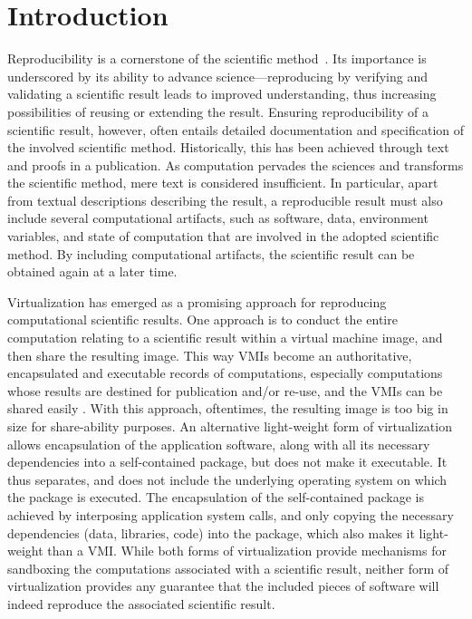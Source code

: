 \section{Introduction}

Reproducibility is a cornerstone of the scientific method~\cite{borgman2012data}. 
Its importance is underscored by its ability to advance science---reproducing by verifying and validating a scientific result leads to improved understanding, thus increasing possibilities of reusing or extending the result. 
Ensuring reproducibility of a scientific result, however, often entails detailed documentation and specification of the involved scientific method. Historically, this has been achieved through text and proofs in a publication. 
As computation pervades the sciences and transforms the scientific method, mere text is considered insufficient. 
In particular, apart from textual descriptions describing the result, a reproducible result must also include several computational artifacts, such as software, data,  environment variables, and state of computation that are involved in the adopted scientific method.  By including computational artifacts, the scientific result can be obtained again at a later time. 

Virtualization has emerged as a promising approach for reproducing computational scientific results. One approach is to conduct the entire computation relating to a scientific result within a virtual machine image, and then share the resulting image. This way VMIs become an authoritative, encapsulated and executable records of computations, especially computations whose results are destined for publication and/or re-use, and the VMIs can be shared easily \cite{}. 
With this approach, oftentimes, the resulting image is too big in size for share-ability purposes. An alternative light-weight form of virtualization allows encapsulation of the application software, along with all its necessary dependencies into a self-contained package, but does not make it executable.  It thus separates, and does not include the underlying operating system on which the package is executed. The encapsulation of the self-contained package is achieved by interposing application system calls, and only copying the necessary dependencies (data, libraries, code) into the package, which also makes it light-weight than a VMI. While both forms of virtualization provide mechanisms for sandboxing the computations associated with a scientific result, neither form of virtualization provides any guarantee that the included pieces of software will indeed reproduce the associated scientific result. 

